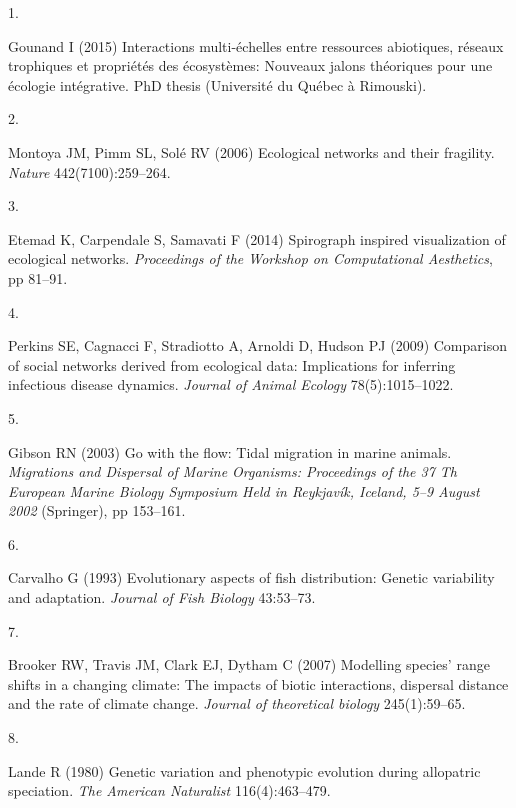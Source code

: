 \documentclass[9pt,twocolumn,twoside,]{pnas-new}
\newlength{\cslhangindent}
\newlength{\csllabelwidth}
\newlength{\cslentryspacingunit} %
\newenvironment{CSLReferences}[2] %
 {%
  \setlength{\parindent}{0pt}
  \ifodd #1
  \let\oldpar\par
  \def\par{\hangindent=\cslhangindent\oldpar}
  \fi
  \setlength{\parskip}{#2\cslentryspacingunit}
 }%
 {}
\newcommand{\CSLLeftMargin}[1]{\parbox[t]{\csllabelwidth}{#1}}
\newcommand{\CSLRightInline}[1]{\parbox[t]{\linewidth - \csllabelwidth}{#1}\break}
\begin{document}
\hypertarget{refs}{}
\begin{CSLReferences}{0}{0}
\leavevmode{}%
\CSLLeftMargin{1. }%
\CSLRightInline{Gounand I (2015) Interactions multi-échelles entre
ressources abiotiques, réseaux trophiques et propriétés des écosystèmes:
Nouveaux jalons théoriques pour une écologie intégrative. PhD thesis
(Université du Québec à Rimouski).}

\leavevmode{}%
\CSLLeftMargin{2. }%
\CSLRightInline{Montoya JM, Pimm SL, Solé RV (2006) Ecological networks
and their fragility. \emph{Nature} 442(7100):259--264.}

\leavevmode{}%
\CSLLeftMargin{3. }%
\CSLRightInline{Etemad K, Carpendale S, Samavati F (2014) Spirograph
inspired visualization of ecological networks. \emph{Proceedings of the
Workshop on Computational Aesthetics}, pp 81--91.}

\leavevmode{}%
\CSLLeftMargin{4. }%
\CSLRightInline{Perkins SE, Cagnacci F, Stradiotto A, Arnoldi D, Hudson
PJ (2009) Comparison of social networks derived from ecological data:
Implications for inferring infectious disease dynamics. \emph{Journal of
Animal Ecology} 78(5):1015--1022.}

\leavevmode{}%
\CSLLeftMargin{5. }%
\CSLRightInline{Gibson RN (2003) Go with the flow: Tidal migration in
marine animals. \emph{Migrations and Dispersal of Marine Organisms:
Proceedings of the 37 Th European Marine Biology Symposium Held in
Reykjavík, Iceland, 5--9 August 2002} (Springer), pp 153--161.}

\leavevmode{}%
\CSLLeftMargin{6. }%
\CSLRightInline{Carvalho G (1993) Evolutionary aspects of fish
distribution: Genetic variability and adaptation. \emph{Journal of Fish
Biology} 43:53--73.}

\leavevmode{}%
\CSLLeftMargin{7. }%
\CSLRightInline{Brooker RW, Travis JM, Clark EJ, Dytham C (2007)
Modelling species' range shifts in a changing climate: The impacts of
biotic interactions, dispersal distance and the rate of climate change.
\emph{Journal of theoretical biology} 245(1):59--65.}

\leavevmode{}%
\CSLLeftMargin{8. }%
\CSLRightInline{Lande R (1980) Genetic variation and phenotypic
evolution during allopatric speciation. \emph{The American Naturalist}
116(4):463--479.}

\end{CSLReferences}



% 
\end{document}
